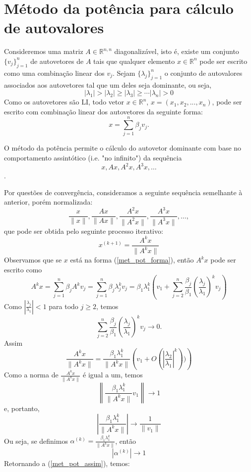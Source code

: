 \section{Método da potência para cálculo de autovalores}
Consideremos uma matriz $A\in \mathbb{R}^{n,n}$ diagonalizável, isto é, existe um conjunto $\{{v}_{j}\}_{j=1}^n$ de autovetores de $A$ tais que qualquer elemento $x\in\mathbb{R}^n$ pode ser escrito como uma combinação linear dos ${v}_{j}$. Sejam $\{\lambda_j\}_{j=1}^n$ o conjunto de autovalores associados aos autovetores tal que um deles seja dominante, ou seja,
$$
|\lambda_1|>|\lambda_2|\geq |\lambda_3|\geq\cdots |\lambda_n|>0
$$
Como os autovetores são LI, todo vetor ${x}\in\mathbb{R}^n$, ${x}=(x_1,x_2,...,x_n)$, pode ser escrito com combinação linear dos autovetores da seguinte forma:
\begin{equation}\label{met_pot_forma}
{x}=\sum_{j=1}^n\beta_j{v}_{j}.
\end{equation}

O método da potência permite o cálculo do autovetor dominante com base no comportamento assintótico (i.e. "no infinito") da sequência
$${x}, A{x}, A^2{x}, A^3{x}, \ldots$$.

Por questões de convergência, consideramos a seguinte sequência semelhante à anterior, porém normalizada:
$$\frac{{x}}{\|{x}\|}, \frac{A{x}}{\|A{x}\|}, \frac{A^2{x}}{\|A^2{x}\|}, \frac{A^3{x}}{\|A^3{x}\|}, \ldots,$$
que pode ser obtida pelo seguinte processo iterativo:
$${x}^{(k+1)}=\frac{A^{k}{x}}{\|A^{k}{x}\|}$$
Observamos que se ${x}$ está na forma (\ref{met_pot_forma}), então $A^k {x}$ pode ser escrito como
$$A^{k}{x} = \sum_{j=1}^n\beta_j A^k {v}_{j}=\sum_{j=1}^n\beta_j \lambda_j^k {v}_{j}= \beta_1\lambda_1^k\left({v}_1+\sum_{j=2}^n\frac{\beta_j}{\beta_1} \left(\frac{\lambda_j}{\lambda_1}\right)^k {v}_{j}\right)$$
Como $\left|\frac{\lambda_j}{\lambda_1}\right|<1$ para todo $j\geq 2$, temos
$$\sum_{j=2}^n\frac{\beta_j}{\beta_1} \left(\frac{\lambda_j}{\lambda_1}\right)^k {v}_{j} \to 0.$$
Assim
\begin{equation}\label{met_pot_assim}\frac{A^k {x}}{\|A^k {x}\|} = \frac{\beta_1\lambda_1^k}{\|A^k {x}\|}\left( {v}_1 + O\left(\left|\frac{\lambda_2}{\lambda_1}\right|^k\right))\right) \end{equation}
Como a norma de $\frac{A^k {x}}{\|A^k {x}\|}$ é igual a um, temos
$$\left\|\frac{\beta_1\lambda_1^k}{\|A^k x\|}{v}_1\right\| \to 1$$
e, portanto,
$$\left|\frac{\beta_1\lambda_1^k}{\|A^k {x}\|}\right| \to \frac{1}{\|{v}_1\|}$$
Ou seja, se definimos $\alpha^{(k)}=\frac{\beta_1\lambda_1^k}{\|A^k {x}\|}$, então
$$
|\alpha^{(k)}|\to 1
$$
Retornando a (\ref{met_pot_assim}), temos:

